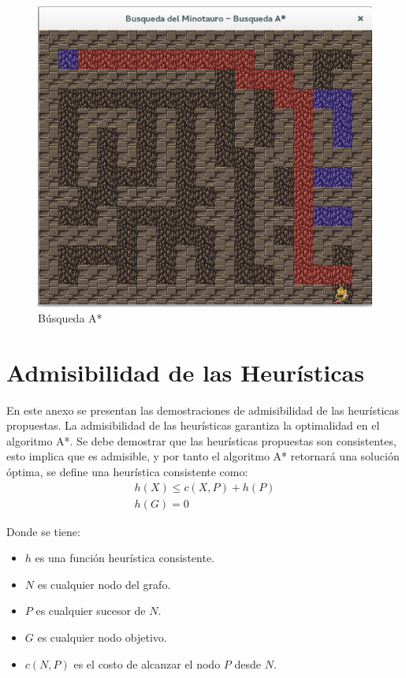 \documentclass[letter, titlepage, 10pt]{article}
\begin{document}
\begin{appendices}
  \begin{figure}[H]
    \begin{center}
        \includegraphics[scale = 0.4]{images/bae_03}
        \caption{Búsqueda A*}
    \end{center}
\end{figure}
    
    \newpage

  \section{Admisibilidad de las Heurísticas}
    En este anexo se presentan las demostraciones de admisibilidad de las heurísticas propuestas. La admisibilidad de las heurísticas garantiza la optimalidad en el algoritmo A*.
    Se debe demostrar que las heurísticas propuestas son consistentes, esto implica que es admisible, y por tanto el algoritmo A* retornará una solución óptima, se define una heurística consistente como:
\begin{align}
h(X) \leq c(X,P) + h(P)\\
h(G) = 0
\end{align}

Donde se tiene:
\begin{itemize}
\item $h$ es una función heurística consistente.
\item $N$ es cualquier nodo del grafo.
\item $P$ es cualquier sucesor de $N$.
\item $G$ es cualquier nodo objetivo.
\item $c(N,P)$ es el costo de alcanzar el nodo $P$ desde $N$.
\end{itemize}


\end{appendices}
\end{document}

